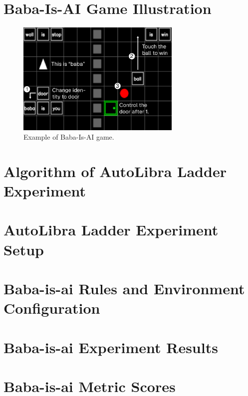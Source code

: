 \section{Baba-Is-AI Game Illustration}
\label{appendix:baba-is-ai}

\begin{figure}[!h]
\centering
\includegraphics[width=0.7\textwidth]{figs/babaisai-self-referential.pdf}
\caption{Example of Baba-Is-AI game.}
\label{fig:baba-is-ai}
\end{figure}

\section{Algorithm of AutoLibra Ladder Experiment}
\label{appendix:algo1}


\section{AutoLibra Ladder Experiment Setup}
\label{appendix:autolibra_setup}


\section{Baba-is-ai Rules and Environment Configuration}
\label{appendix:baba_is_ai_rules}


\section{Baba-is-ai Experiment Results}
\label{appendix:heldout}


\section{Baba-is-ai Metric Scores}
\label{appendix:babaisai}

\newpage

